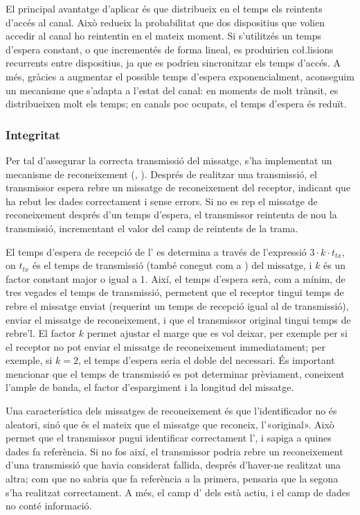 \documentclass{tfgitic}[2024/07/01]
\begin{document}
El principal avantatge d'aplicar  és que distribueix en el temps els reintents d'accés al canal. Això redueix la probabilitat que dos dispositius que volien accedir al canal ho reintentin en el mateix moment. Si s'utilitzés un temps d'espera constant, o que incrementés de forma lineal, es produirien co\l.lisions recurrents entre dispositius, ja que es podrien sincronitzar els temps d'accés. A més, gràcies a augmentar el possible temps d'espera exponencialment, aconseguim un mecanisme que s'adapta a l'estat del canal: en moments de molt trànsit, es distribueixen molt els temps; en canals poc ocupats, el temps d'espera és reduït.
\subsubsection{Integritat}
\label{subsubsec:integritat}
Per tal d'assegurar la correcta transmissió del missatge, s'ha implementat un mecanisme de reconeixement (, ). Després de realitzar una transmissió, el transmissor espera rebre un missatge de reconeixement del receptor, indicant que ha rebut les dades correctament i sense errors. Si no es rep el missatge de reconeixement després d'un temps d'espera, el transmissor reintenta de nou la transmissió, incrementant el valor del camp de reintents de la trama.

El temps d'espera de recepció de l' es determina a través de l'expressió $3 \cdot k \cdot t_{tx}$, on $t_{tx}$ és el temps de transmissió (també conegut com a ) del missatge, i $k$ és un factor constant major o igual a 1. Així, el temps d'espera serà, com a mínim, de tres vegades el temps de transmissió, permetent que el receptor tingui temps de rebre el missatge enviat (requerint un temps de recepció igual al de transmissió), enviar el missatge de reconeixement, i que el transmissor original tingui temps de rebre'l. El factor ${k}$ permet ajustar el marge que es vol deixar, per exemple per si el receptor no pot enviar el missatge de reconeixement immediatament; per exemple, si $k=2$, el temps d'espera seria el doble del necessari. És important mencionar que el temps de transmissió es pot determinar prèviament, coneixent l'ample de banda, el factor d'espargiment i la longitud del missatge.

Una característica dels missatges de reconeixement és que l'identificador no és aleatori, sinó que és el mateix que el missatge que reconeix, l'«original». Això permet que el transmissor pugui identificar correctament l', i sapiga a quines dades fa referència. Si no fos així, el transmissor podria rebre un reconeixement d'una transmissió que havia considerat fallida, després d'haver-ne realitzat una altra; com que no sabria que fa referència a la primera, pensaria que la segona s'ha realitzat correctament. A més, el camp d' dels  està actiu, i el camp de dades no conté informació.
\end{document}
